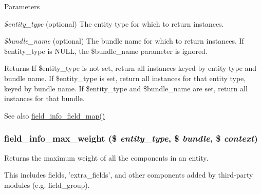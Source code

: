 \begin{DoxyParams}{Parameters}
\item[{\em \$entity\_\-type}](optional) The entity type for which to return instances. \item[{\em \$bundle\_\-name}](optional) The bundle name for which to return instances. If \$entity\_\-type is NULL, the \$bundle\_\-name parameter is ignored.\end{DoxyParams}
\begin{DoxyReturn}{Returns}
If \$entity\_\-type is not set, return all instances keyed by entity type and bundle name. If \$entity\_\-type is set, return all instances for that entity type, keyed by bundle name. If \$entity\_\-type and \$bundle\_\-name are set, return all instances for that bundle.
\end{DoxyReturn}
\begin{DoxySeeAlso}{See also}
\hyperlink{group__field__info_gacb01ef76f6e24f61dbd2ae56c44f7eee}{field\_\-info\_\-field\_\-map()} 
\end{DoxySeeAlso}
\hypertarget{group__field__info_ga4761d1f619b3492edd9b133ae63c850b}{
\subsubsection[{field\_\-info\_\-max\_\-weight}]{\setlength{\rightskip}{0pt plus 5cm}field\_\-info\_\-max\_\-weight (\$ {\em entity\_\-type}, \/  \$ {\em bundle}, \/  \$ {\em context})}}
\label{group__field__info_ga4761d1f619b3492edd9b133ae63c850b}
Returns the maximum weight of all the components in an entity.

This includes fields, 'extra\_\-fields', and other components added by third-\/party modules (e.g. field\_\-group).


